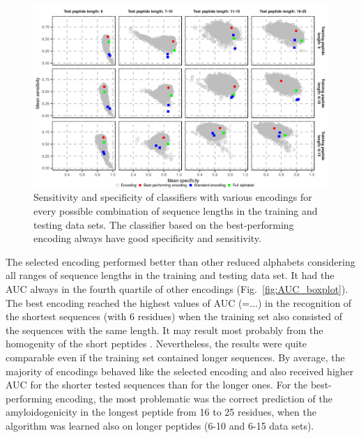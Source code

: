 \documentclass[a4,center,fleqn]{NAR}
\begin{document}
\begin{figure}[!tpb]
\centerline{\includegraphics{figures/sesp_plot.png}}
\caption{Sensitivity and specificity of classifiers with various encodings for 
every possible combination of sequence lengths in the training and testing data sets.
The classifier based on the best-performing encoding always have 
good specificity and sensitivity.}\label{fig:sesp_plot}
\end{figure}

%
%

The selected encoding performed better than other reduced alphabets considering 
all ranges of sequence lengths in the training and testing data set. It had the AUC
always in the fourth quartile of other encodings (Fig.~\ref{fig:AUC_boxplot}).   The best encoding reached the highest values of AUC (=...) in the recognition of the shortest sequences (with 6 residues) when the training set also consisted of the sequences with the same length. It may result most probably from the homogenity of the short peptides . Nevertheless, the results were quite comparable even if the training set contained longer sequences. By average, the majority of encodings behaved like the selected encoding and also received higher AUC for the shorter tested sequences than for the longer ones.
For the best-performing encoding, the most problematic was the correct prediction of the 
amyloidogenicity in the longest peptide from 16 to 25 residues, when the algorithm was learned also on longer peptides (6-10 and 6-15 data sets).
\end{document}
